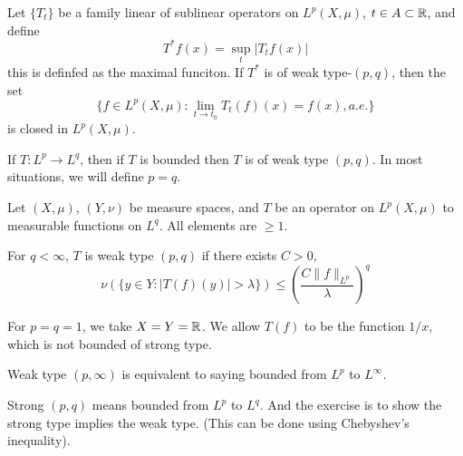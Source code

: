 \begin{theorem}
    Let $\{T_t\}$ be a family linear of sublinear operators on $L^p(X,\mu)$, $t\in A\subset\mathbb{R}$, and define
    \begin{equation*}
        T^*f(x)=\sup_t|T_tf(x)|
    \end{equation*}
    this is definfed as the maximal funciton. If $T^*$ is of weak type-$(p,q)$, then the set
    \begin{equation*}
        \{f\in L^p(X,\mu): \lim_{t\to t_0}T_t(f)(x)=f(x), a.e. \}
    \end{equation*}
    is closed in $L^p(X,\mu)$.
\end{theorem}
\begin{remark}
    If $T: L^p\to L^q$, then if $T$ is bounded then $T$ is of weak type $(p,q)$. In most situations, we will define $p=q$.
\end{remark}

Let $(X,\mu)$, $(Y,\nu)$ be measure spaces, and $T$ be an operator on $L^p(X,\mu)$ to measurable functions on $L^q$. All elements are $\geq 1$.
\begin{definition}
    For $q<\infty$, $T$ is weak type $(p,q)$ if there exists $C>0$,
    \begin{equation*}
        \nu\left(\{y\in Y: |T(f)(y)|>\lambda\} \right)\leq\left(\frac{C\|f\|_{L^p}}{\lambda} \right)^q
    \end{equation*}
\end{definition}
\begin{example}
    For $p=q=1$, we take $X=Y=\mathbb{R}$. We allow $T(f)$ to be the function $1/x$, which is not bounded of strong type.
\end{example}

\begin{exercise}
    Weak type $(p,\infty)$ is equivalent to saying bounded from $L^p$ to $L^\infty$.

    Strong $(p,q)$ means bounded from $L^p$ to $L^q$. And the exercise is to show the strong type implies the weak type. (This can be done using Chebyshev's inequality).
\end{exercise}

